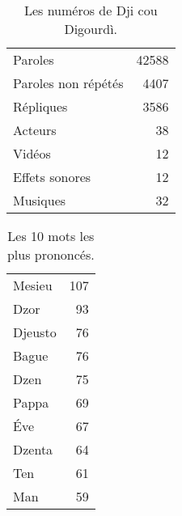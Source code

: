 
\vfill
\begin{table}[h]
\centering
\caption{Les numéros de Dji cou Digourdì.}
\begin{tabular}{lr}
    \toprule
Paroles & 42588 \\
Paroles non répétés & 4407 \\
Répliques & 3586 \\
Acteurs & 38 \\
Vidéos & 12 \\
Effets sonores & 12 \\
Musiques & 32 \\
\bottomrule
\end{tabular}%
\end{table}
\vfill
\newpage
\vfill
\begin{table}[h]
\centering
\caption{Les 10 mots les plus prononcés.}
\begin{tabular}{lr}
    \toprule

\multicolumn{1}{l}{Mesieu} &107\\
\multicolumn{1}{l}{Dzor} &93\\
\multicolumn{1}{l}{Djeusto} &76\\
\multicolumn{1}{l}{Bague} &76\\
\multicolumn{1}{l}{Dzen} &75\\
\multicolumn{1}{l}{Pappa} &69\\
\multicolumn{1}{l}{Éve} &67\\
\multicolumn{1}{l}{Dzenta} &64\\
\multicolumn{1}{l}{Ten} &61\\
\multicolumn{1}{l}{Man} &59\\
\bottomrule
\end{tabular}%
\end{table}
\vfill
\newpage
\scriptsize
